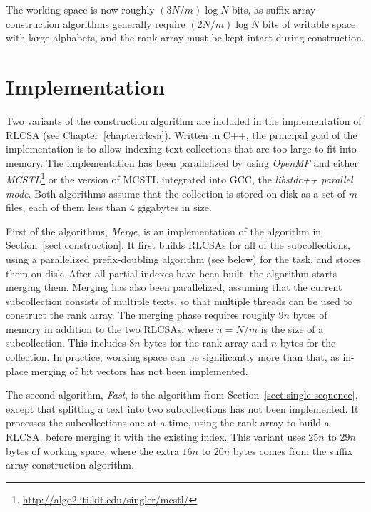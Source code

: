 The working space is now roughly $(3N/m) \log N$ bits, as suffix array construction algorithms generally require $(2N/m) \log N$ bits of writable space with large alphabets, and the rank array must be kept intact during construction.


\section{Implementation}\label{sect:construction implementation}

Two variants of the construction algorithm are included in the implementation of RLCSA (see Chapter~\ref{chapter:rlcsa}). Written in C++, the principal goal of the implementation is to allow indexing text collections that are too large to fit into memory. The implementation has been parallelized by using \emph{OpenMP} and either \emph{MCSTL}\footnote{\url{http://algo2.iti.kit.edu/singler/mcstl/}} or the version of MCSTL integrated into GCC, the \emph{libstdc++ parallel mode}. Both algorithms assume that the collection is stored on disk as a set of $m$ files, each of them less than $4$ gigabytes in size.

First of the algorithms, \emph{Merge}, is an implementation of the algorithm in Section~\ref{sect:construction}. It first builds RLCSAs for all of the subcollections, using a parallelized prefix-doubling algorithm (see below) for the task, and stores them on disk. After all partial indexes have been built, the algorithm starts merging them. Merging has also been parallelized, assuming that the current subcollection consists of multiple texts, so that multiple threads can be used to construct the rank array. The merging phase requires roughly $9n$ bytes of memory in addition to the two RLCSAs, where $n = N/m$ is the size of a subcollection. This includes $8n$ bytes for the rank array and $n$ bytes for the collection. In practice, working space can be significantly more than that, as in-place merging of bit vectors has not been implemented.

The second algorithm, \emph{Fast}, is the algorithm from Section~\ref{sect:single sequence}, except that splitting a text into two subcollections has not been implemented. It processes the subcollections one at a time, using the rank array to build a RLCSA, before merging it with the existing index. This variant uses $25n$ to $29n$ bytes of working space, where the extra $16n$ to $20n$ bytes comes from the suffix array construction algorithm.

